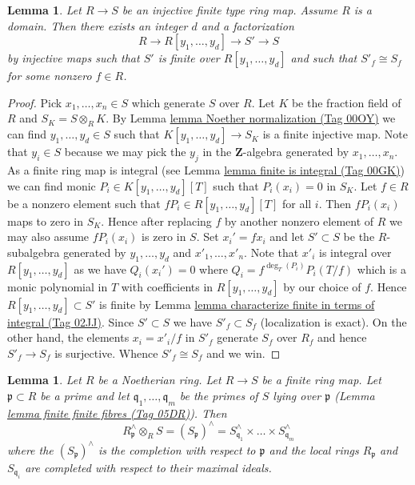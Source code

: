 \documentclass{amsart}
\theoremstyle{plain}
\newtheorem{lemma}[subsection]{Lemma}
\theoremstyle{definition}
\theoremstyle{remark}
\numberwithin{equation}{subsection}
\begin{document}
\begin{lemma}
\label{algebra-lemma-Noether-normalization-over-a-domain}
Let $R \to S$ be an injective finite type ring map. Assume $R$ is a domain.
Then there exists an integer $d$ and a factorization
$$
R \to R[y_1, \ldots, y_d] \to S' \to S
$$
by injective maps such that $S'$ is finite over $R[y_1, \ldots, y_d]$
and such that $S'_f \cong S_f$ for some nonzero $f \in R$.
\end{lemma}

\begin{proof}
Pick $x_1, \ldots, x_n \in S$ which generate $S$ over $R$.
Let $K$ be the fraction field of $R$ and $S_K = S \otimes_R K$.
By Lemma \href{https://stacks.math.columbia.edu/tag/00OY}{lemma Noether normalization (Tag 00OY)}
we can find $y_1, \ldots, y_d \in S$ such that $K[y_1, \ldots, y_d] \to S_K$
is a finite injective map. Note that $y_i \in S$ because we may pick the
$y_j$ in the $\mathbf{Z}$-algebra generated by $x_1, \ldots, x_n$.
As a finite ring map is integral (see
Lemma \href{https://stacks.math.columbia.edu/tag/00GK}{lemma finite is integral (Tag 00GK)})
we can find monic $P_i \in K[y_1, \ldots, y_d][T]$ such that
$P_i(x_i) = 0$ in $S_K$. Let $f \in R$ be a nonzero element such that
$fP_i \in R[y_1, \ldots, y_d][T]$ for all $i$. Then $fP_i(x_i)$
maps to zero in $S_K$. Hence after replacing $f$ by another
nonzero element of $R$ we may also assume $fP_i(x_i)$ is zero in $S$.
Set $x_i' = fx_i$ and let $S' \subset S$ be the $R$-subalgebra generated by
$y_1, \ldots, y_d$ and $x'_1, \ldots, x'_n$. Note that $x'_i$ is integral over
$R[y_1, \ldots, y_d]$ as we have $Q_i(x_i') = 0$ where
$Q_i = f^{\deg_T(P_i)}P_i(T/f)$ which is a monic polynomial in
$T$ with coefficients in $R[y_1, \ldots, y_d]$ by our choice of $f$.
Hence $R[y_1, \ldots, y_d] \subset S'$ is finite by
Lemma \href{https://stacks.math.columbia.edu/tag/02JJ}{lemma characterize finite in terms of integral (Tag 02JJ)}.
Since $S' \subset S$ we have $S'_f \subset S_f$ (localization is exact).
On the other hand, the elements $x_i = x'_i/f$ in $S'_f$ generate $S_f$
over $R_f$ and hence $S'_f \to S_f$ is surjective. Whence
$S'_f \cong S_f$ and we win.
\end{proof}


\begin{lemma}
\label{algebra-lemma-completion-finite-extension}
Let $R$ be a Noetherian ring. Let $R \to S$ be a finite ring map.
Let $\mathfrak p \subset R$ be a prime and let
$\mathfrak q_1, \ldots, \mathfrak q_m$ be the primes of $S$
lying over $\mathfrak p$
(Lemma \href{https://stacks.math.columbia.edu/tag/05DR}{lemma finite finite fibres (Tag 05DR)}).
Then
$$
R_\mathfrak p^\wedge \otimes_R S =
(S_\mathfrak p)^\wedge =
S_{\mathfrak q_1}^\wedge \times \ldots \times S_{\mathfrak q_m}^\wedge
$$
where the $(S_\mathfrak p)^\wedge$ is the completion with respect to
$\mathfrak p$ and the local rings $R_\mathfrak p$ and
$S_{\mathfrak q_i}$ are completed with respect to their maximal ideals.
\end{lemma}
\end{document}

